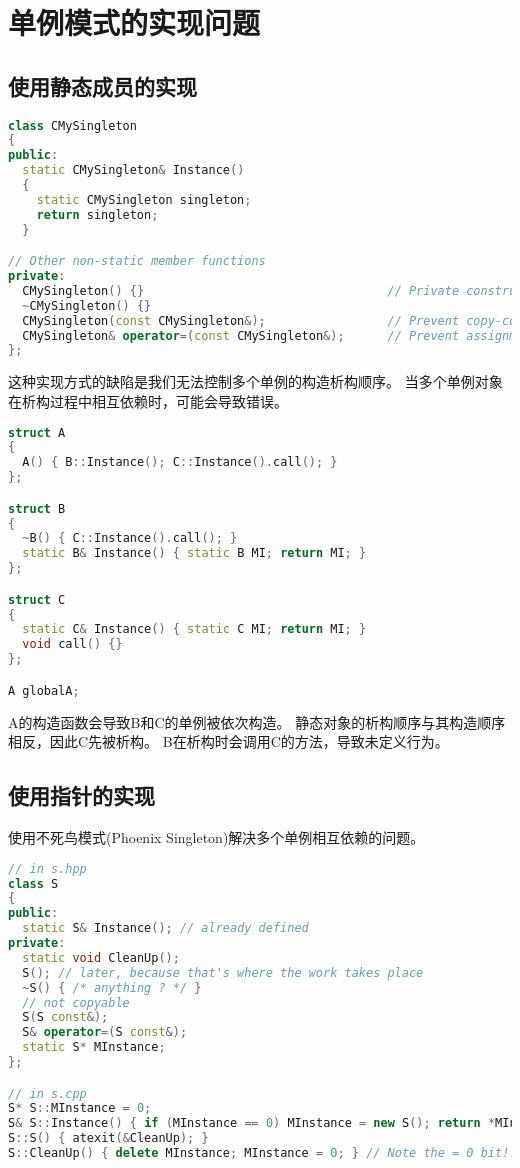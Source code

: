 \section{单例模式的实现问题}

\subsection{使用静态成员的实现}
\begin{lstlisting}[language=C++] 
class CMySingleton
{
public:
  static CMySingleton& Instance()
  {
    static CMySingleton singleton;
    return singleton;
  }

// Other non-static member functions
private:
  CMySingleton() {}                                  // Private constructor
  ~CMySingleton() {}
  CMySingleton(const CMySingleton&);                 // Prevent copy-construction
  CMySingleton& operator=(const CMySingleton&);      // Prevent assignment
};
\end{lstlisting}

这种实现方式的缺陷是我们无法控制多个单例的构造析构顺序。
当多个单例对象在析构过程中相互依赖时，可能会导致错误。
\begin{lstlisting}[language=C++] 
struct A
{
  A() { B::Instance(); C::Instance().call(); }
};

struct B
{
  ~B() { C::Instance().call(); }
  static B& Instance() { static B MI; return MI; }
};

struct C
{
  static C& Instance() { static C MI; return MI; }
  void call() {}
};

A globalA;
\end{lstlisting}
A的构造函数会导致B和C的单例被依次构造。
静态对象的析构顺序与其构造顺序相反，因此C先被析构。
B在析构时会调用C的方法，导致未定义行为。

\subsection{使用指针的实现}
使用不死鸟模式(Phoenix Singleton)解决多个单例相互依赖的问题。

\begin{lstlisting}[language=C++] 
// in s.hpp
class S
{
public:
  static S& Instance(); // already defined
private:
  static void CleanUp();
  S(); // later, because that's where the work takes place
  ~S() { /* anything ? */ }
  // not copyable
  S(S const&);
  S& operator=(S const&);
  static S* MInstance;
};

// in s.cpp
S* S::MInstance = 0;
S& S::Instance() { if (MInstance == 0) MInstance = new S(); return *MInstance; }
S::S() { atexit(&CleanUp); }
S::CleanUp() { delete MInstance; MInstance = 0; } // Note the = 0 bit!!!

\end{lstlisting}



